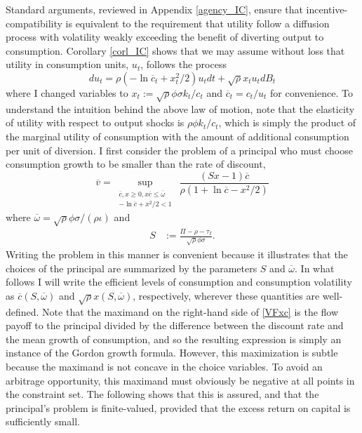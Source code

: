 \documentclass[11pt]{article}
\theoremstyle{plain}
\theoremstyle{definition} %
\begin{document}
Standard arguments, reviewed in Appendix \ref{agency_IC}, ensure that incentive-compatibility is equivalent to the requirement that utility follow a diffusion process with volatility weakly exceeding the benefit of diverting output to consumption. Corollary \ref{corl_IC} shows that we may assume without loss that utility in consumption units, $u_t$, follows the process
\begin{equation} %
du_t = \rho{\left( -\ln \overline{c}_t + x_t^2/2\right)}u_tdt + \sqrt{\rho} x_tu_tdB_t
\label{LoM}
\end{equation} 
where I changed variables to $x_t := \sqrt{\rho} \phi \sigma k_t/c_t$ and $\overline{c}_t= c_t/u_t$ for convenience. To understand the intuition behind the above law of motion, note that the elasticity of utility with respect to output shocks is $\rho \phi k_t/c_t$, which is simply the product of the marginal utility of consumption with the amount of additional consumption per unit of diversion. I first consider the problem of a principal who must choose consumption growth to be smaller than the rate of discount, 
\begin{equation}
\overline{v} = \sup_{\substack{\overline{c},x\geq 0, x\overline{c} \leq \overline{\omega} \\ -\ln \overline{c} + x^2/2<1}} \ \frac{(Sx - 1)\overline{c}}{\rho(1 + \ln \overline{c} - x^2/2)}
\label{VFxc}
\end{equation}
where $\overline{\omega} = \sqrt{\rho}\phi\sigma/(\rho \iota)$ and
\begin{equation}
\begin{aligned}
S & := \frac{\Pi - \rho - \tau_I}{\sqrt{\rho}\phi \sigma}.
\end{aligned}
\label{newQ}
\end{equation} 
Writing the problem in this manner is convenient because it illustrates that the choices of the principal are summarized by the parameters $S$ and $\overline{\omega}$. In what follows I will write the efficient levels of consumption and consumption volatility as $\overline{c}(S, \overline{\omega})$ and $\sqrt{\rho} x(S, \overline{\omega})$, respectively, wherever these quantities are well-defined. Note that the maximand on the right-hand side of \eqref{VFxc} is the flow payoff to the principal divided by the difference between the discount rate and the mean growth of consumption, and so the resulting expression is simply an instance of the Gordon growth formula. However, this maximization is subtle because the maximand is not concave in the choice variables. To avoid an arbitrage opportunity, this maximand must obviously be negative at all points in the constraint set. The following shows that this is assured, and that the principal's problem is finite-valued, provided that the excess return on capital is sufficiently small. 
\end{document}
